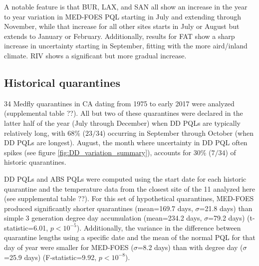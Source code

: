 \documentclass[10pt,a4paper,twocolumn]{article}
\begin{document}
A notable feature is that BUR, LAX, and SAN all show an increase in the year to year variation
in MED-FOES PQL starting in July and extending through November, 
while that increase for all other sites starts in July or August 
but extends to January or February.
Additionally, results for FAT show a sharp increase in uncertainty starting in September, fitting with the 
more aird/inland climate.  RIV shows a significant but more gradual increase.

\subsection*{Historical quarantines}

34 Medfly quarantines in CA dating from 1975 to early 2017 were analyzed (supplemental table ??).
All but two of these quarantines were declared in the latter half of the year
(July through December) when DD PQLs are typically relatively long,
with 68\% ($23/34$) occurring in September through October (when DD PQLs are
longest). 
August, the month where uncertainty in DD PQL often spikes 
(see figure \ref{fig:DD_variation_summary}), 
accounts for 30\% ($7/34$) of historic quarantines.

DD PQLs and ABS PQLs were computed using the start date for each historic
quarantine and the temperature data from the closest site of the 11 analyzed
here (see supplemental table ??).
For this set of hypothetical quarantines, 
MED-FOES produced significantly shorter quarantines
(mean=169.7 days, $\sigma$=21.8 days)
than simple 3 generation degree day accumulation
(mean=234.2 days, $\sigma$=79.2 days)
(t-statistic=6.01, $p<10^{-5}$).
Additionally, the variance in the difference between quarantine lengths
using a specific date and the mean of the normal PQL for that day of year
were smaller for MED-FOES ($\sigma$=8.2 days)
than with degree day ($\sigma$=25.9 days)
(F-statistic=9.92, $p<10^{-8}$).
\end{document}
